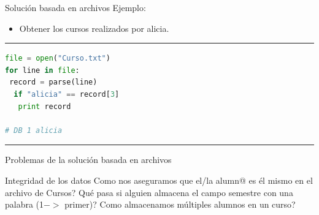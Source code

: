 \documentclass{beamer}
\begin{document}
 
 
 \begin{frame}[fragile]{Solución basada en archivos}
 Ejemplo:
 \begin{itemize}
\item Obtener los cursos realizados por alicia.
 \end{itemize}
 \rule{\textwidth}{1pt}
\begin{lstlisting}[language=Python]
file = open("Curso.txt")
for line in file:
 record = parse(line)
  if "alicia" == record[3]
   print record
   
# DB 1 alicia

\end{lstlisting}
\rule{\textwidth}{1pt}
\end{frame}
 
 
  \begin{frame}{Problemas de la solución basada en archivos}

  \begin{outline}
  \1 Integridad de los datos
  \2 Como nos aseguramos que el/la alumn@ es él mismo en el archivo de Cursos?
  \2 Qué pasa si alguien almacena el  campo semestre con una palabra (1$->$ primer)?
  \2 Como almacenamos múltiples alumnos en un curso?
  \end{outline}
  \end{frame}
 
\end{document}
